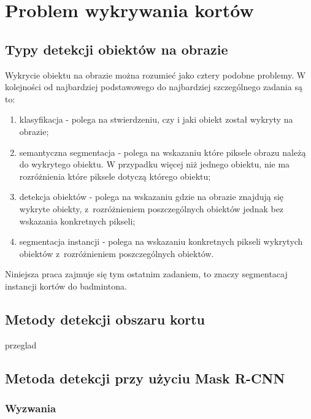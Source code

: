 \chapter{Problem wykrywania kortów}

\section{Typy detekcji obiektów na obrazie}
\label{sec:typy_detekcji}

Wykrycie obiektu na obrazie można rozumieć jako cztery podobne problemy.
W kolejności od najbardziej podstawowego do najbardziej szczególnego zadania są to:

\begin{enumerate}
	\item klasyfikacja - polega na stwierdzeniu, czy i jaki obiekt został wykryty na obrazie;
  \item semantyczna segmentacja - polega na wskazaniu które piksele obrazu należą do wykrytego obiektu.
        W przypadku więcej niż jednego obiektu, nie ma rozróżnienia które piksele dotyczą którego obiektu;
	\item detekcja obiektów - polega na wskazaniu gdzie na obrazie znajdują się wykryte obiekty, z~rozróżnieniem poszczególnych obiektów jednak bez wskazania konkretnych pikseli;
	\item segmentacja instancji - polega na wskazaniu konkretnych pikseli wykrytych obiektów z~rozróżnieniem poszczególnych obiektów.
\end{enumerate}

Niniejsza praca zajmuje się tym ostatnim zadaniem, to znaczy segmentacaj instancji kortów do badmintona.

\section{Metody detekcji obszaru kortu}


{przeglad}

\section{Metoda detekcji przy użyciu Mask R-CNN}

\subsection{Wyzwania}


